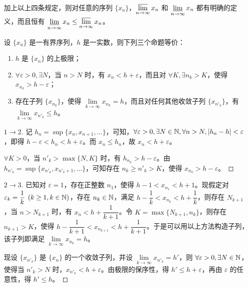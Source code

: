 加上以上四条规定，则对任意的序列 $\{x_n\}$，$\mathop{\overline \lim}\limits_{n \rightarrow \infty} x_n$ 和 $\mathop{\underline \lim}\limits_{n \rightarrow \infty} x_n$ 都有明确的定义，而且恒有 $\mathop{\underline \lim}\limits_{n \rightarrow \infty} x_n \le \mathop{\overline \lim}\limits_{n \rightarrow \infty} x_n$。

\begin{theorem}
	设 $\{x_n\}$ 是一有界序列，$h$ 是一实数，则下列三个命题等价：

	\begin{enumerate}
		\item $h$ 是 $\{x_n\}$ 的上极限；
		\item $\forall \varepsilon > 0, \exists N$，当 $n > N$ 时，有 $x_n < h + \varepsilon$，而且对 $\forall K, \exists n_k > K$，使得 $x_{n_k} > h - \varepsilon$；
		\item 存在子列 $\{x_{n_k}\}$，使得 $\lim\limits_{k \rightarrow \infty} x_{n_k} = h$，而且对任何其他收敛子列 $\{x_{n'_k}\}$，有 $\lim\limits_{k \rightarrow \infty} x_{n'_k} \le h$。
	\end{enumerate}
\end{theorem}

\begin{proof}[$1 \rightarrow 2$]
	记 $h_n = \sup \{x_n, x_{n + 1}, \ldots\}$，可知，$\forall \varepsilon > 0, \exists N \in \mathbb N, \forall n > N, |h_n - h| < \varepsilon$，即得 $h - \varepsilon < h_n < h + \varepsilon$。而 $x_n \le h_n$，故 $x_n < h + \varepsilon$。

	$\forall K > 0$，当 $n'_k > \max \{N, K\}$ 时，有 $h_{n_k} > h - \varepsilon$。由 $h_{n'_k} = \sup \{ x_{n'_k}, x_{n'_k + 1}, \ldots \}$，可知存在 $n_k \ge n'_k > K$，使得 $x_{n_k} > h - \varepsilon$。
\end{proof}

\begin{proof}[$2 \rightarrow 3$]
	已知对 $\varepsilon = 1$，存在正整数 $n_1$，使得 $h - 1 < x_{n_1} < h + 1$。现假定对 $\varepsilon_k = \dfrac{1}{k} \pod{k \ge 1, k \in \mathbb N}$，存在 $n_k \in \mathbb N$，满足 $h - \dfrac{1}{k} < x_{n_k} < h + \dfrac{1}{k}$，则存在 $N_{k + 1}$，当 $n > N_{k + 1}$ 时，有 $x_n < h + \dfrac{1}{k + 1}$。令 $K = \max \{N_{k + 1}, n_k\}$，则存在 $n_{k + 1} > K$，使得 $h - \dfrac{1}{k + 1} < x_{n_{k + 1}} < h + \dfrac{1}{k + 1}$。于是可以用以上方法构造子列，该子列即满足 $\lim\limits_{k \to \infty} x_{n_k} = h$。

	现设 $\{x_{n'_k}\}$ 是 $\{x_n\}$ 的一个收敛子列，并设 $\lim\limits_{k \to \infty} x_{n'_k} = h'$，则 $\forall \varepsilon > 0, \exists N \in \mathbb N$，使得当 $n'_k > N$ 时，$x_{n'_k} < h + \varepsilon$。由极限的保序性，得 $h' \le h + \varepsilon$，再由 $\varepsilon$ 的任意性，得 $h' \le h$。
\end{proof}

